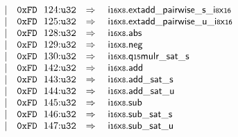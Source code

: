 $$\begin{array}[t]{@{}lrrl@{}l@{}l@{}l@{}}
& & | & \mathtt{0xFD}~~124{:}{\mathtt{u32}} & \quad\Rightarrow\quad{} & {\mathsf{i{\scriptstyle 16}}}{\mathsf{x}}{\mathsf{{\scriptstyle 8}}} {.} {{\mathsf{extadd\_pairwise}}{\mathsf{\_}}{\mathsf{s}}}{\mathsf{\_}}{{\mathsf{i{\scriptstyle 8}}}{\mathsf{x}}{\mathsf{{\scriptstyle 16}}}} \\
& & | & \mathtt{0xFD}~~125{:}{\mathtt{u32}} & \quad\Rightarrow\quad{} & {\mathsf{i{\scriptstyle 16}}}{\mathsf{x}}{\mathsf{{\scriptstyle 8}}} {.} {{\mathsf{extadd\_pairwise}}{\mathsf{\_}}{\mathsf{u}}}{\mathsf{\_}}{{\mathsf{i{\scriptstyle 8}}}{\mathsf{x}}{\mathsf{{\scriptstyle 16}}}} \\
& & | & \mathtt{0xFD}~~128{:}{\mathtt{u32}} & \quad\Rightarrow\quad{} & {\mathsf{i{\scriptstyle 16}}}{\mathsf{x}}{\mathsf{{\scriptstyle 8}}} {.} \mathsf{abs} \\
& & | & \mathtt{0xFD}~~129{:}{\mathtt{u32}} & \quad\Rightarrow\quad{} & {\mathsf{i{\scriptstyle 16}}}{\mathsf{x}}{\mathsf{{\scriptstyle 8}}} {.} \mathsf{neg} \\
& & | & \mathtt{0xFD}~~130{:}{\mathtt{u32}} & \quad\Rightarrow\quad{} & {\mathsf{i{\scriptstyle 16}}}{\mathsf{x}}{\mathsf{{\scriptstyle 8}}} {.} {\mathsf{q{\scriptstyle 15}mulr\_sat}}{\mathsf{\_}}{\mathsf{s}} \\
& & | & \mathtt{0xFD}~~142{:}{\mathtt{u32}} & \quad\Rightarrow\quad{} & {\mathsf{i{\scriptstyle 16}}}{\mathsf{x}}{\mathsf{{\scriptstyle 8}}} {.} \mathsf{add} \\
& & | & \mathtt{0xFD}~~143{:}{\mathtt{u32}} & \quad\Rightarrow\quad{} & {\mathsf{i{\scriptstyle 16}}}{\mathsf{x}}{\mathsf{{\scriptstyle 8}}} {.} {\mathsf{add\_sat}}{\mathsf{\_}}{\mathsf{s}} \\
& & | & \mathtt{0xFD}~~144{:}{\mathtt{u32}} & \quad\Rightarrow\quad{} & {\mathsf{i{\scriptstyle 16}}}{\mathsf{x}}{\mathsf{{\scriptstyle 8}}} {.} {\mathsf{add\_sat}}{\mathsf{\_}}{\mathsf{u}} \\
& & | & \mathtt{0xFD}~~145{:}{\mathtt{u32}} & \quad\Rightarrow\quad{} & {\mathsf{i{\scriptstyle 16}}}{\mathsf{x}}{\mathsf{{\scriptstyle 8}}} {.} \mathsf{sub} \\
& & | & \mathtt{0xFD}~~146{:}{\mathtt{u32}} & \quad\Rightarrow\quad{} & {\mathsf{i{\scriptstyle 16}}}{\mathsf{x}}{\mathsf{{\scriptstyle 8}}} {.} {\mathsf{sub\_sat}}{\mathsf{\_}}{\mathsf{s}} \\
& & | & \mathtt{0xFD}~~147{:}{\mathtt{u32}} & \quad\Rightarrow\quad{} & {\mathsf{i{\scriptstyle 16}}}{\mathsf{x}}{\mathsf{{\scriptstyle 8}}} {.} {\mathsf{sub\_sat}}{\mathsf{\_}}{\mathsf{u}} \\

\end{array}$$
